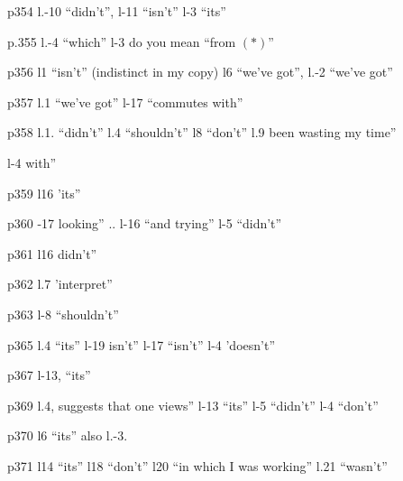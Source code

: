p354 l.-10 ``didn't'', l-11 ``isn't'' l-3 ``its''

p.355 l.-4 ``which'' l-3 do you mean ``from $(*)$''

p356 l1 ``isn't'' (indistinct in my copy) l6 ``we've got'',  l.-2 ``we've got''

p357 l.1 ``we've got''  l-17 ``commutes with''

p358 l.1. ``didn't'' l.4 ``shouldn't'' l8 ``don't'' l.9 been wasting my time''

l-4  with''

p359 l16 'its''

p360 -17  looking'' .. l-16 ``and trying'' l-5 ``didn't''

p361 l16 didn't''

p362 l.7 'interpret''

p363 l-8 ``shouldn't''

p365 l.4 ``its'' l-19 isn't'' l-17 ``isn't'' l-4 'doesn't''

p367 l-13, ``its''

p369 l.4, suggests that one views'' l-13 ``its'' l-5 ``didn't'' l-4 ``don't''

p370 l6 ``its'' also l.-3.

p371 l14 ``its'' l18 ``don't'' l20 ``in which I was working'' l.21 ``wasn't''


